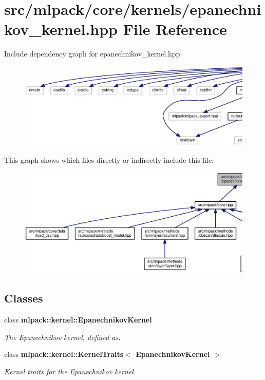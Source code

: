 \section{src/mlpack/core/kernels/epanechnikov\+\_\+kernel.hpp File Reference}
\label{epanechnikov__kernel_8hpp}
Include dependency graph for epanechnikov\+\_\+kernel.\+hpp\+:
\nopagebreak
\begin{figure}[H]
\begin{center}
\leavevmode
\includegraphics[width=350pt]{epanechnikov__kernel_8hpp__incl}
\end{center}
\end{figure}
This graph shows which files directly or indirectly include this file\+:
\nopagebreak
\begin{figure}[H]
\begin{center}
\leavevmode
\includegraphics[width=350pt]{epanechnikov__kernel_8hpp__dep__incl}
\end{center}
\end{figure}
\subsection*{Classes}
\begin{DoxyCompactItemize}
\item 
class {\bf mlpack\+::kernel\+::\+Epanechnikov\+Kernel}
\begin{DoxyCompactList}\small\item\em The Epanechnikov kernel, defined as. \end{DoxyCompactList}\item 
class {\bf mlpack\+::kernel\+::\+Kernel\+Traits$<$ Epanechnikov\+Kernel $>$}
\begin{DoxyCompactList}\small\item\em Kernel traits for the Epanechnikov kernel. \end{DoxyCompactList}\end{DoxyCompactItemize}
